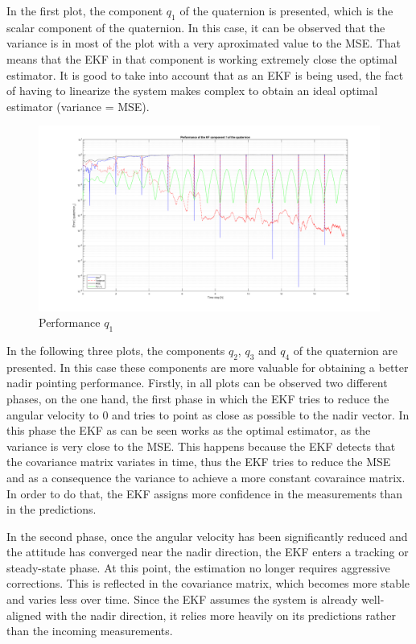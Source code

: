 \begin{itemize}
    In the first plot, the component $q_1$ of the quaternion is presented, which is the scalar component of the quaternion. In this case,
    it can be observed that the variance is in most of the plot with a very aproximated value to the MSE. That means that the EKF in that
    component is working extremely close the optimal estimator. It is good to take into account that as an EKF is being used, the fact of 
    having to linearize the system makes complex to obtain an ideal optimal estimator (variance = MSE).  
    \begin{figure}[H]
        \centering
        \includegraphics[width=\linewidth]{res/img/Nadir_EKF/EKF_performance/performance q1.png}
        \caption{Performance $q_1$}
        \label{fig:EKF_PerformanceQ1}
    \end{figure}

    In the following three plots, the components $q_2$, $q_3$ and $q_4$ of the quaternion are presented. In this case these components
    are more valuable for obtaining a better nadir pointing performance. Firstly, in all plots can be observed two different phases, 
    on the one hand, the first phase in which the EKF tries to reduce the angular velocity to 0 and tries to point as close as possible to 
    the nadir vector. In this phase the EKF as can be seen works as the optimal estimator, as the variance is very close to the MSE. This happens
    because the EKF detects that the covariance matrix variates in time, thus the EKF tries to reduce the MSE and as a 
    consequence the variance to achieve a more constant covaraince matrix. In order to do that, the EKF assigns more confidence in the measurements 
    than in the predictions.

    In the second phase, once the angular velocity has been significantly reduced and the attitude has converged near the nadir direction, 
    the EKF enters a tracking or steady-state phase. At this point, the estimation no longer requires aggressive corrections. This is reflected in 
    the covariance matrix, which becomes more stable and varies less over time.
    Since the EKF assumes the system is already well-aligned with the nadir direction, it relies more heavily on its predictions rather than the incoming measurements. 



\end{itemize}
